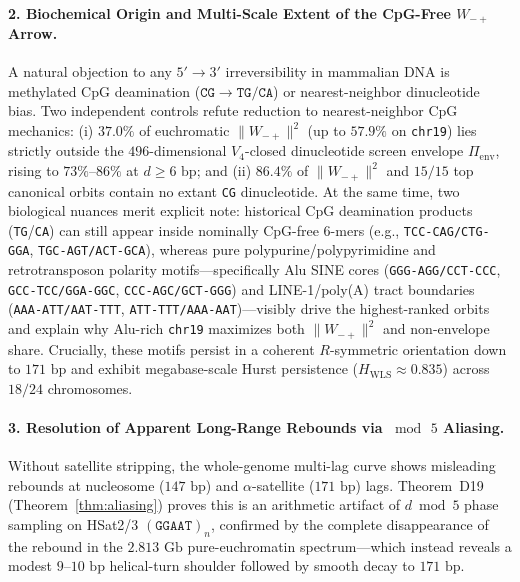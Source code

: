 \documentclass[11pt,a4paper]{article}
\newcommand{\Wmp}{W_{-+}}
\newcommand{\Pienv}{\Pi_{\mathrm{env}}}
\begin{document}
\paragraph{2. Biochemical Origin and Multi-Scale Extent of the CpG-Free $\Wmp$ Arrow.}
A natural objection to any $5'\!\to 3'$ irreversibility in mammalian DNA is methylated CpG deamination ($\texttt{CG}\!\to\!\texttt{TG}/\texttt{CA}$) or nearest-neighbor dinucleotide bias. Two independent controls refute reduction to nearest-neighbor CpG mechanics: (i) $37.0\%$ of euchromatic $\|\Wmp\|^2$ (up to $57.9\%$ on \texttt{chr19}) lies strictly outside the $496$-dimensional $V_4$-closed dinucleotide screen envelope $\Pienv$, rising to $73\%$--$86\%$ at $d \ge 6\text{ bp}$; and (ii) $86.4\%$ of $\|\Wmp\|^2$ and $15/15$ top canonical orbits contain no extant \texttt{CG} dinucleotide. At the same time, two biological nuances merit explicit note: historical CpG deamination products (\texttt{TG}/\texttt{CA}) can still appear inside nominally CpG-free 6-mers (e.g., \texttt{TCC-CAG/CTG-GGA}, \texttt{TGC-AGT/ACT-GCA}), whereas pure polypurine/polypyrimidine and retrotransposon polarity motifs---specifically Alu SINE cores (\texttt{GGG-AGG/CCT-CCC}, \texttt{GCC-TCC/GGA-GGC}, \texttt{CCC-AGC/GCT-GGG}) and LINE-1/poly(A) tract boundaries (\texttt{AAA-ATT/AAT-TTT}, \texttt{ATT-TTT/AAA-AAT})---visibly drive the highest-ranked orbits and explain why Alu-rich \texttt{chr19} maximizes both $\|\Wmp\|^2$ and non-envelope share. Crucially, these motifs persist in a coherent $R$-symmetric orientation down to $171\text{ bp}$ and exhibit megabase-scale Hurst persistence ($H_{\mathrm{WLS}} \approx 0.835$) across $18/24$ chromosomes.

\paragraph{3. Resolution of Apparent Long-Range Rebounds via $\bmod\,5$ Aliasing.}
Without satellite stripping, the whole-genome multi-lag curve shows misleading rebounds at nucleosome ($147\text{ bp}$) and $\alpha$-satellite ($171\text{ bp}$) lags. Theorem~D19 (Theorem~\ref{thm:aliasing}) proves this is an arithmetic artifact of $d \bmod 5$ phase sampling on HSat2/3 $(\texttt{GGAAT})_n$, confirmed by the complete disappearance of the rebound in the $2.813\text{ Gb}$ pure-euchromatin spectrum---which instead reveals a modest $9\text{--}10\text{ bp}$ helical-turn shoulder followed by smooth decay to $171\text{ bp}$.
\end{document}
